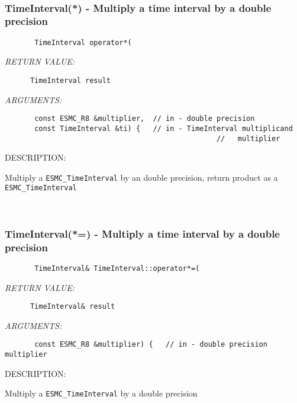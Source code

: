 \mbox{}\hrulefill\ 
 
\subsubsection [TimeInterval(*)] {TimeInterval(*) - Multiply a time interval by a double precision}


  
\begin{verbatim}       TimeInterval operator*(\end{verbatim}{\em RETURN VALUE:}
\begin{verbatim}      TimeInterval result\end{verbatim}{\em ARGUMENTS:}
\begin{verbatim}       const ESMC_R8 &multiplier,  // in - double precision
       const TimeInterval &ti) {   // in - TimeInterval multiplicand
                                                  //   multiplier\end{verbatim}
{\sf DESCRIPTION:\\ }


       Multiply a {\tt ESMC\_TimeInterval} by an double precision,
       return product as a {\tt ESMC\_TimeInterval}
   
 
\mbox{}\hrulefill\ 
 
\subsubsection [TimeInterval(*=)] {TimeInterval(*=) - Multiply a time interval by a double precision}


  
\begin{verbatim}       TimeInterval& TimeInterval::operator*=(\end{verbatim}{\em RETURN VALUE:}
\begin{verbatim}      TimeInterval& result\end{verbatim}{\em ARGUMENTS:}
\begin{verbatim}       const ESMC_R8 &multiplier) {   // in - double precision multiplier\end{verbatim}
{\sf DESCRIPTION:\\ }


       Multiply a {\tt ESMC\_TimeInterval} by a double precision
   
 
